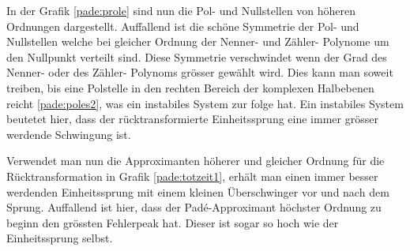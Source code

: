 In der Grafik \ref{pade:prole} sind nun die Pol- und Nullstellen von höheren Ordnungen dargestellt. 
Auffallend ist die schöne Symmetrie der Pol- und Nullstellen welche bei gleicher Ordnung der Nenner- und Zähler- Polynome um den Nullpunkt verteilt sind.
Diese Symmetrie verschwindet wenn der Grad des Nenner- oder des Zähler- Polynoms grösser gewählt wird.
Dies kann man soweit treiben, bis eine Polstelle in den rechten Bereich der komplexen Halbebenen reicht \ref{pade:poles2},
was ein instabiles System zur folge hat.
Ein instabiles System beutetet hier, dass der rücktransformierte Einheitssprung eine immer grösser werdende Schwingung ist.
 
\begin{figure}
	\centering
\end{figure}
Verwendet man nun die Approximanten höherer und gleicher Ordnung für die Rücktransformation in Grafik \ref{pade:totzeit1}, erhält man einen immer besser werdenden Einheitssprung mit einem kleinen Überschwinger vor und nach dem Sprung. 
Auffallend ist hier, dass der Padé-Approximant höchster Ordnung zu beginn den grössten Fehlerpeak hat.
Dieser ist sogar so hoch wie der Einheitssprung selbst.

